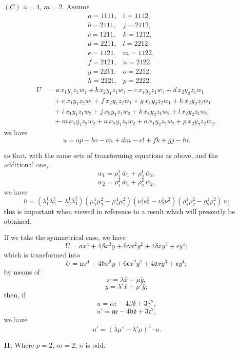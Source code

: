 \documentclass[11pt,a4paper]{article}
\theoremstyle{plain}
\theoremstyle{definition}
\theoremstyle{remark}
\begin{document}
$(C)$ $n=4$, $m=2$. Assume
\[
\begin{array}{cccc}
a = 1111,& i = 1112,& & \\
b = 2111,& j = 2112,& & \\
c = 1211,& k = 1212,& & \\
d = 2211,& l = 2212,& & \\
e = 1121,& m = 1122,& & \\
f = 2121,& n = 2122,& & \\
g = 2211,& o = 2212,& & \\
h = 2221,& p = 2222.& &
\end{array}
\]
\[
\begin{aligned}
U &= a\,x_1y_1z_1w_1 + b\,x_2y_1z_1w_1 + c\,x_1y_2z_1w_1 + d\,x_2y_2z_1w_1 \\
&\quad + e\,x_1y_1z_2w_1 + f\,x_2y_1z_2w_1 + g\,x_1y_2z_2w_1 + h\,x_2y_2z_2w_1 \\
&\quad + i\,x_1y_1z_1w_2 + j\,x_2y_1z_1w_2 + k\,x_1y_2z_1w_2 + l\,x_2y_2z_1w_2 \\
&\quad + m\,x_1y_1z_2w_2 + n\,x_2y_1z_2w_2 + o\,x_1y_2z_2w_2 + p\,x_2y_2z_2w_2,
\end{aligned}
\]
we have
\[
u = ap - bo - cn + dm - el + fk + gj - hi.
\]

\newpage

so that, with the same sets of transforming equations as above, and the additional one,
\[
w_1 = \rho_1^1\,\bar{w}_1 + \rho_2^1\,\bar{w}_2,
\]
\[
w_2 = \rho_1^2\,\bar{w}_1 + \rho_2^2\,\bar{w}_2,
\]
we have
\[
\bar{u} = (\lambda_1^1\lambda_2^2 - \lambda_2^1\lambda_1^2)(\mu_1^1\mu_2^2 - \mu_2^1\mu_1^2)(\nu_1^1\nu_2^2 - \nu_2^1\nu_1^2)(\rho_1^1\rho_2^2 - \rho_2^1\rho_1^2)\,u;
\]
this is important when viewed in reference to a result which will presently be obtained.

If we take the symmetrical case, we have
\[
U = ax^4 + 4\beta x^3y + 6\gamma x^2y^2 + 4\delta xy^3 + \epsilon y^4;
\]
which is transformed into
\[
U = \mathfrak{a}\bar{x}^4 + 4\mathfrak{b}\bar{x}^3\bar{y} + 6\mathfrak{c}\bar{x}^2\bar{y}^2 + 4\mathfrak{d}\bar{x}\bar{y}^3 + \mathfrak{e}\bar{y}^4;
\]
by means of
\[
x = \lambda\bar{x} + \mu\bar{y},
\]
\[
y = \lambda'\bar{x} + \mu'\bar{y};
\]
then, if
\[
u = \alpha\epsilon - 4\beta\delta + 3\gamma^2,
\]
\[
u' = \mathfrak{a}\mathfrak{e} - 4\mathfrak{b}\mathfrak{d} + 3\mathfrak{c}^2,
\]
we have
\[
u' = (\lambda\mu' - \lambda'\mu)^4\cdot u.
\]

\noindent\textbf{II.} Where $p=2$, $m=2$, $n$ is odd.
\end{document}
